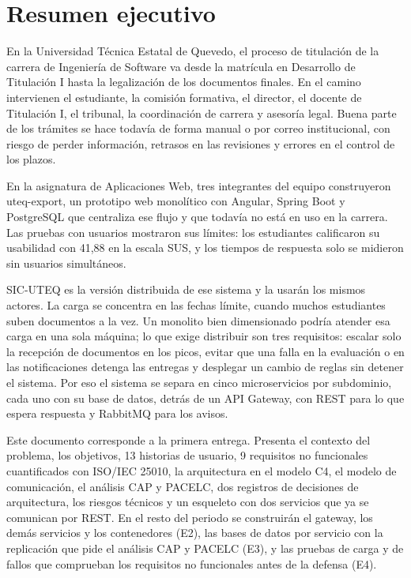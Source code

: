\section*{Resumen ejecutivo}\label{sec:resumen}

En la Universidad Técnica Estatal de Quevedo, el proceso de titulación de la carrera de Ingeniería de Software va desde la matrícula en Desarrollo de Titulación I hasta la legalización de los documentos finales. En el camino intervienen el estudiante, la comisión formativa, el director, el docente de Titulación I, el tribunal, la coordinación de carrera y asesoría legal. Buena parte de los trámites se hace todavía de forma manual o por correo institucional, con riesgo de perder información, retrasos en las revisiones y errores en el control de los plazos.

En la asignatura de Aplicaciones Web, tres integrantes del equipo construyeron uteq-export, un prototipo web monolítico con Angular, Spring Boot y PostgreSQL que centraliza ese flujo y que todavía no está en uso en la carrera. Las pruebas con usuarios mostraron sus límites: los estudiantes calificaron su usabilidad con 41,88 en la escala SUS, y los tiempos de respuesta solo se midieron sin usuarios simultáneos.

SIC-UTEQ es la versión distribuida de ese sistema y la usarán los mismos actores. La carga se concentra en las fechas límite, cuando muchos estudiantes suben documentos a la vez. Un monolito bien dimensionado podría atender esa carga en una sola máquina; lo que exige distribuir son tres requisitos: escalar solo la recepción de documentos en los picos, evitar que una falla en la evaluación o en las notificaciones detenga las entregas y desplegar un cambio de reglas sin detener el sistema. Por eso el sistema se separa en cinco microservicios por subdominio, cada uno con su base de datos, detrás de un API Gateway, con REST para lo que espera respuesta y RabbitMQ para los avisos.

Este documento corresponde a la primera entrega. Presenta el contexto del problema, los objetivos, 13 historias de usuario, 9 requisitos no funcionales cuantificados con ISO/IEC 25010, la arquitectura en el modelo C4, el modelo de comunicación, el análisis CAP y PACELC, dos registros de decisiones de arquitectura, los riesgos técnicos y un esqueleto con dos servicios que ya se comunican por REST. En el resto del periodo se construirán el gateway, los demás servicios y los contenedores (E2), las bases de datos por servicio con la replicación que pide el análisis CAP y PACELC (E3), y las pruebas de carga y de fallos que comprueban los requisitos no funcionales antes de la defensa (E4).
